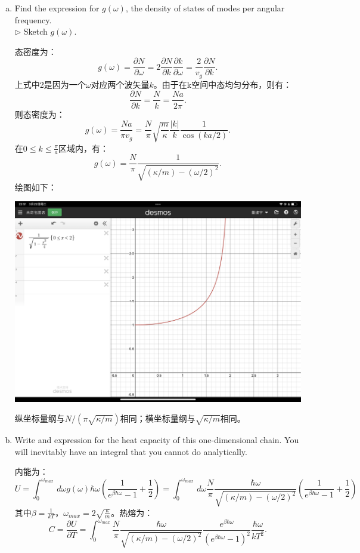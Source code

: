 \documentclass[reqno,a4paper,12pt]{amsart}
\begin{document}
\begin{enumerate}[(a)]
	\item Find the expression for $g(\omega)$, the density of states of modes per angular frequency. \\
	$\triangleright$ Sketch $g(\omega)$.
	\begin{tcolorbox}[breakable, colback = black!5!white, colframe = black]
	态密度为：
	\[
		g(\omega) = \frac{\partial N}{\partial \omega} = 2\frac{\partial N}{\partial k}\frac{\partial k}{\partial \omega} = \frac{2}{v_g}\frac{\partial N}{\partial k}.
	\]
	上式中2是因为一个$\omega$对应两个波矢量$k$。由于在k空间中态均匀分布，则有：
	\[
		\frac{\partial N}{\partial k} = \frac{N}{k} = \frac{Na}{2\pi}.
	\]
	则态密度为：
	\[
		g(\omega) = \frac{Na}{\pi v_g} = \frac{N}{\pi}\sqrt{\frac{m}{\kappa}} \frac{\vert k \vert}{k}\frac{1}{\cos(ka/2)}.
	\]
	在$0\leq k \leq \frac{\pi}{a}$区域内，有：
	\[
		g(\omega) = \frac{N}{\pi}\frac{1}{\sqrt{(\kappa/m) - (\omega/2)^2}}.
	\]
	绘图如下：
	\begin{center}
		\includegraphics[scale = 0.32]{9-2-e.png}
	\end{center}
	纵坐标量纲与$N/(\pi \sqrt{\kappa/m})$相同；横坐标量纲与$\sqrt{\kappa/m}$相同。
	\end{tcolorbox}
	
	\item Write and expression for the heat capacity of this one-dimensional chain. You will inevitably have an integral that you cannot do analytically. 
	\begin{tcolorbox}[breakable, colback = black!5!white, colframe = black]
	内能为：
	\[
		U = \int_0^{\omega_{max}} \,d\omega g(\omega) \hbar\omega \left(\frac{1}{e^{\beta\hbar\omega}-1} + \frac{1}{2}\right) = \int_0^{\omega_{max}} \,d\omega \frac{N}{\pi} \frac{\hbar\omega}{\sqrt{(\kappa/m) - (\omega/2)^2}} \left(\frac{1}{e^{\beta\hbar\omega}-1} + \frac{1}{2}\right)
	\]
	其中$\beta = \frac{1}{kT}$，$\omega_{max} = 2\sqrt{\frac{\kappa}{m}}$。热熔为：
	\[
		C = \frac{\partial U}{\partial T} = \int_0^{\omega_{max}} \frac{N}{\pi} \frac{\hbar\omega}{\sqrt{(\kappa/m) - (\omega/2)^2}} \frac{e^{\beta\hbar\omega}}{(e^{\beta\hbar\omega} -1)^2} \frac{\hbar\omega}{k T^2}.
	\]
	\end{tcolorbox}
	

\end{enumerate}
\end{document}
